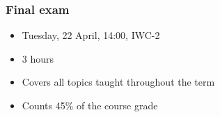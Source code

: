 % 
% 	
% 
% 	
% 
% 	
% 
% 	
% 

\begin{frame}\frametitle{Final exam}
	\begin{itemize}
		\item	Tuesday, 22 April, 14:00, IWC-2 {\color{myOrange}{(please confirm)}}
		\item	3 hours 
		\item	Covers all topics taught throughout the term
		\item	Counts 45\% of the course grade
	\end{itemize}
\end{frame}

